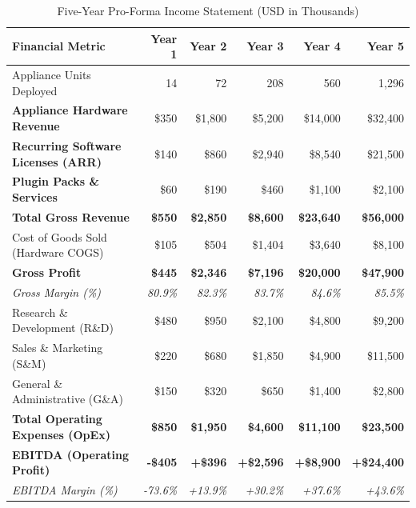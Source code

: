 \documentclass[11pt,a4paper]{article}
\begin{document}
\begin{table}[h]
\centering
\small
\caption{Five-Year Pro-Forma Income Statement (USD in Thousands)}
\label{tab:financials}
\vspace{0.2cm}
\begin{tabularx}{\textwidth}{lrrrrr}
\toprule
\textbf{Financial Metric} & \textbf{Year 1} & \textbf{Year 2} & \textbf{Year 3} & \textbf{Year 4} & \textbf{Year 5} \\ \midrule
Appliance Units Deployed & 14 & 72 & 208 & 560 & 1,296 \\
\textbf{Appliance Hardware Revenue} & \$350 & \$1,800 & \$5,200 & \$14,000 & \$32,400 \\
\textbf{Recurring Software Licenses (ARR)} & \$140 & \$860 & \$2,940 & \$8,540 & \$21,500 \\
\textbf{Plugin Packs \& Services} & \$60 & \$190 & \$460 & \$1,100 & \$2,100 \\ \midrule
\textbf{Total Gross Revenue} & \textbf{\$550} & \textbf{\$2,850} & \textbf{\$8,600} & \textbf{\$23,640} & \textbf{\$56,000} \\
Cost of Goods Sold (Hardware COGS) & \$105 & \$504 & \$1,404 & \$3,640 & \$8,100 \\ \midrule
\textbf{Gross Profit} & \textbf{\$445} & \textbf{\$2,346} & \textbf{\$7,196} & \textbf{\$20,000} & \textbf{\$47,900} \\
\emph{Gross Margin (\%)} & \emph{80.9\%} & \emph{82.3\%} & \emph{83.7\%} & \emph{84.6\%} & \emph{85.5\%} \\
Research \& Development (R\&D) & \$480 & \$950 & \$2,100 & \$4,800 & \$9,200 \\
Sales \& Marketing (S\&M) & \$220 & \$680 & \$1,850 & \$4,900 & \$11,500 \\
General \& Administrative (G\&A) & \$150 & \$320 & \$650 & \$1,400 & \$2,800 \\ \midrule
\textbf{Total Operating Expenses (OpEx)} & \textbf{\$850} & \textbf{\$1,950} & \textbf{\$4,600} & \textbf{\$11,100} & \textbf{\$23,500} \\ \midrule
\textbf{EBITDA (Operating Profit)} & \textbf{-\$405} & \textbf{+\$396} & \textbf{+\$2,596} & \textbf{+\$8,900} & \textbf{+\$24,400} \\
\emph{EBITDA Margin (\%)} & \emph{-73.6\%} & \emph{+13.9\%} & \emph{+30.2\%} & \emph{+37.6\%} & \emph{+43.6\%} \\ \bottomrule
\end{tabularx}
\end{table}
\end{document}
